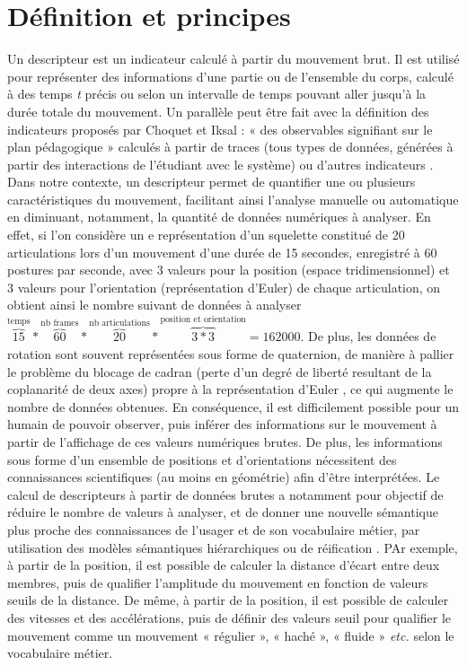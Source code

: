 \section{Définition et principes}
Un descripteur est un indicateur calculé à partir du mouvement brut. Il est utilisé pour représenter des informations d'une partie ou de l'ensemble du corps, calculé à des temps \textit{t} précis ou selon un intervalle de temps pouvant aller jusqu’à la durée totale du mouvement. Un parallèle peut être fait avec la définition des indicateurs proposés par Choquet et Iksal : « des observables signifiant sur le plan pédagogique » calculés à partir de traces (tous types de données, générées à partir des interactions de l’étudiant avec le système) ou d'autres indicateurs \parencite{Choquet2007MTf}. Dans notre contexte, un descripteur permet de quantifier une ou plusieurs caractéristiques du mouvement, facilitant ainsi l'analyse manuelle ou automatique en diminuant, notamment, la quantité de données numériques à analyser. En effet, si l'on considère un e représentation d'un squelette constitué de 20 articulations lors d'un mouvement d'une durée de 15 secondes, enregistré à 60 postures par seconde, avec 3 valeurs pour la position (espace tridimensionnel) et 3 valeurs pour l'orientation (représentation d'Euler) de chaque articulation, on obtient ainsi le nombre suivant de données à analyser  $\overbrace{15}^{\text{temps}}*\overbrace{60}^{\text{nb frames}}*\overbrace{20}^{\text{nb articulations}}*\overbrace{3*3}^{\text{position et orientation}} = 162000$. De plus, les données de rotation sont souvent représentées sous forme de quaternion, de manière à pallier le problème du blocage de cadran (perte d'un degré de liberté resultant de la coplanarité de deux axes) propre à la représentation d'Euler \parencite{Kuipers2000QaR}, ce qui augmente le nombre de données obtenues. En conséquence, il est difficilement possible pour un humain de pouvoir observer, puis inférer des informations sur le mouvement à partir de l'affichage de ces valeurs numériques brutes. De plus, les informations sous forme d'un ensemble de positions et d'orientations nécessitent des connaissances scientifiques (au moins en géométrie) afin d'être interprétées. Le calcul de descripteurs à partir de données brutes a notamment pour objectif de réduire le nombre de valeurs à analyser, et de donner une nouvelle sémantique plus proche des connaissances de l'usager et de son vocabulaire métier, par utilisation des modèles sémantiques hiérarchiques ou de réification \parencite{Baudouin2008Rdt}. PAr exemple, à partir de la position, il est possible de calculer la distance d'écart entre deux membres, puis de qualifier l'amplitude du mouvement en fonction de valeurs seuils de la distance. De même, à partir de la position, il est possible de calculer des vitesses et des accélérations, puis de définir des valeurs seuil pour qualifier le mouvement comme un mouvement « régulier », « haché », « fluide » \textit{etc.} selon le vocabulaire métier.

